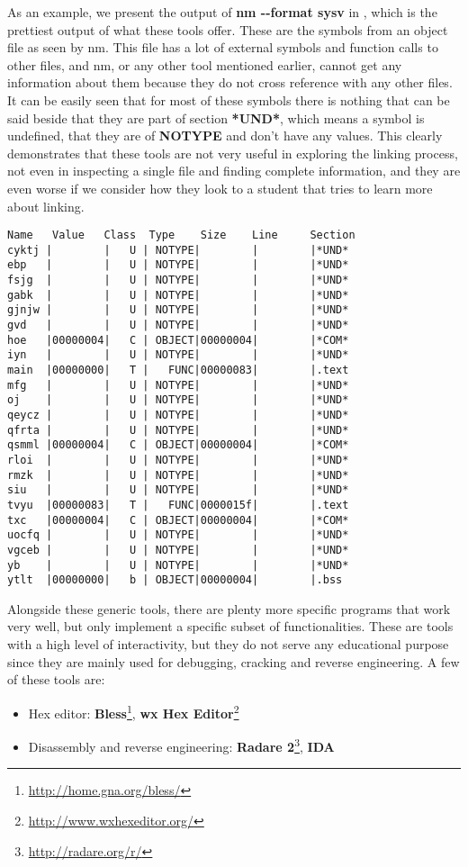 As an example, we present the output of \textbf{nm -{}-{}format sysv} in , which is the prettiest output of what these tools offer. These are the symbols from an object file as seen by nm. This file has a lot of external symbols and function calls to other files, and nm, or any other tool mentioned earlier, cannot get any information about them because they do not cross reference with any other files. It can be easily seen that for most of these symbols there is nothing that can be said beside that they are part of section \textbf{*UND*}, which means a symbol is undefined, that they are of \textbf{NOTYPE} and don't have any values. This clearly demonstrates that these tools are not very useful in exploring the linking process, not even in inspecting a single file and finding complete information, and they are even worse if we consider how they look to a student that tries to learn more about linking.
\bigbreak
{}
\begin{lstlisting}
Name   Value   Class  Type    Size    Line     Section 
cyktj |        |   U | NOTYPE|        |        |*UND* 
ebp   |        |   U | NOTYPE|        |        |*UND* 
fsjg  |        |   U | NOTYPE|        |        |*UND* 
gabk  |        |   U | NOTYPE|        |        |*UND* 
gjnjw |        |   U | NOTYPE|        |        |*UND* 
gvd   |        |   U | NOTYPE|        |        |*UND* 
hoe   |00000004|   C | OBJECT|00000004|        |*COM* 
iyn   |        |   U | NOTYPE|        |        |*UND* 
main  |00000000|   T |   FUNC|00000083|        |.text 
mfg   |        |   U | NOTYPE|        |        |*UND* 
oj    |        |   U | NOTYPE|        |        |*UND* 
qeycz |        |   U | NOTYPE|        |        |*UND* 
qfrta |        |   U | NOTYPE|        |        |*UND* 
qsmml |00000004|   C | OBJECT|00000004|        |*COM* 
rloi  |        |   U | NOTYPE|        |        |*UND* 
rmzk  |        |   U | NOTYPE|        |        |*UND* 
siu   |        |   U | NOTYPE|        |        |*UND* 
tvyu  |00000083|   T |   FUNC|0000015f|        |.text 
txc   |00000004|   C | OBJECT|00000004|        |*COM* 
uocfq |        |   U | NOTYPE|        |        |*UND* 
vgceb |        |   U | NOTYPE|        |        |*UND* 
yb    |        |   U | NOTYPE|        |        |*UND* 
ytlt  |00000000|   b | OBJECT|00000004|        |.bss

\end{lstlisting}

Alongside these generic tools, there are plenty more specific programs that work very well, but only implement a specific subset of functionalities. These are tools with a high level of interactivity, but they do not serve any educational purpose since they are mainly used for debugging, cracking and reverse engineering. A few of these tools are:

\begin{itemize}  
	\item Hex editor: \textbf{Bless}\footnote{\url{http://home.gna.org/bless/}}, \textbf{wx Hex Editor}\footnote{\url{http://www.wxhexeditor.org/}}
	\item Disassembly and reverse engineering: \textbf{Radare 2}\footnote{\url{http://radare.org/r/}}, \textbf{IDA}
\end{itemize}
